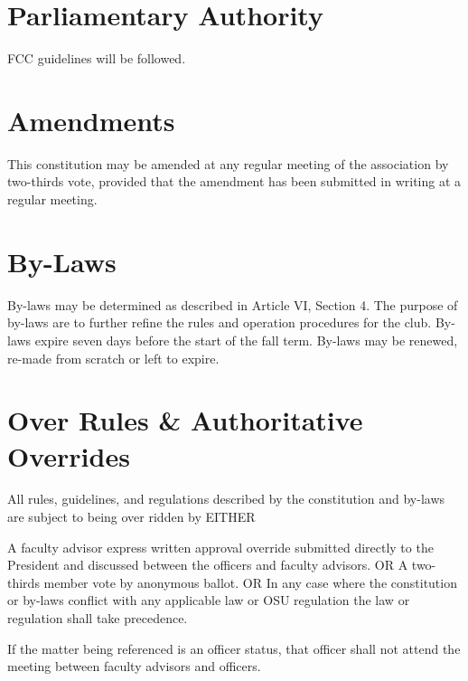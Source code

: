 \documentclass[10pt,letterpaper]{article}
\begin{document}
\part{Parliamentary Authority}

FCC guidelines will be followed.

\part{Amendments}

This constitution may be amended at any regular meeting of the association by two-thirds vote, provided that the amendment has been submitted in writing at a regular meeting.

\part{By-Laws}

By-laws may be determined as described in Article VI, Section 4. The purpose of by-laws are to further refine the rules and operation procedures for the club. By-laws expire seven days before the start of the fall term. By-laws may be renewed, re-made from scratch or left to expire.

\part{Over Rules \& Authoritative Overrides}

All rules, guidelines, and regulations described by the constitution and by-laws are subject to being over ridden by EITHER

A faculty advisor express written approval override submitted directly to the President and discussed between the officers and faculty advisors.
OR
A two-thirds member vote by anonymous ballot.
OR
In any case where the constitution or by-laws conflict with any applicable law or OSU regulation the law or regulation shall take precedence.

If the matter being referenced is an officer status, that officer shall not attend the meeting between faculty advisors and officers.
\end{document}
